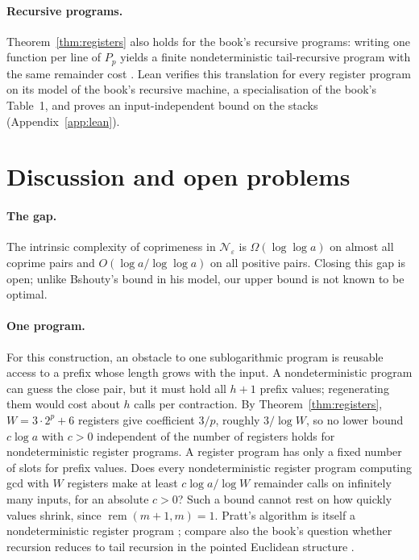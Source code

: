 \documentclass[11pt]{article}
\theoremstyle{remark}
\newcommand{\rem}{\operatorname{rem}}
\begin{document}
\paragraph{Recursive programs.}
Theorem~\ref{thm:registers} also holds for the book's recursive programs:
writing one function per line of $P_p$ yields a finite nondeterministic
tail-recursive program with the same remainder cost
\cite[\S\S2A, 2C, 2E]{moschovakis2019}.
Lean verifies this translation for every register program on its model of
the book's recursive machine, a specialisation of the book's Table~1, and
proves an input-independent bound on the stacks (Appendix~\ref{app:lean}).

\section{Discussion and open problems}\label{sec:discussion}
\paragraph{The gap.}
The intrinsic complexity of coprimeness in $\mathcal N_\varepsilon$ is
$\Omega(\log\log a)$ on almost all coprime pairs and $O(\log a/\log\log a)$
on all positive pairs. Closing this gap is open;
unlike Bshouty's bound in his model, our upper bound is not known to be
optimal.

\paragraph{One program.}
For this construction, an obstacle to one sublogarithmic program is reusable
access to a prefix whose length grows with the input. A nondeterministic
program can guess the close pair, but it must hold all $h+1$ prefix values;
regenerating them would cost about $h$ calls per contraction. By
Theorem~\ref{thm:registers}, $W=3\cdot2^p+6$ registers give coefficient
$3/p$, roughly $3/\log W$, so no lower bound $c\log a$ with $c>0$ independent of
the number of registers holds for nondeterministic register programs. A register
program has only a fixed number of slots for prefix values. Does every
nondeterministic register program computing gcd with $W$ registers make at
least $c\log a/\log W$ remainder calls on infinitely many inputs, for an
absolute $c>0$? Such a bound cannot rest on how quickly values shrink,
since $\rem(m+1,m)=1$. Pratt's algorithm is itself a nondeterministic
register program \cite[Theorem~2E.2]{moschovakis2019}; compare also the
book's question whether recursion reduces to tail recursion in the pointed
Euclidean structure \cite[Problem~x2G.6]{moschovakis2019}.
\end{document}
